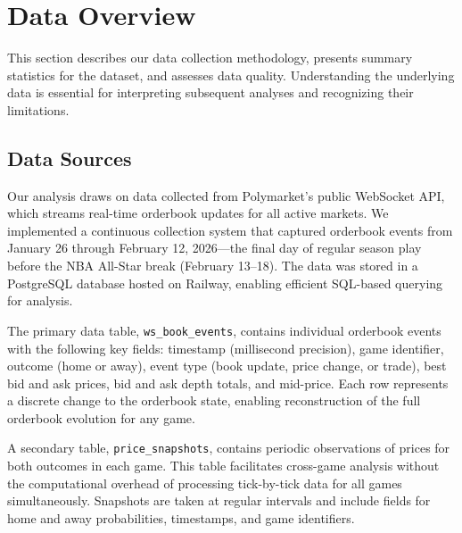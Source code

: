 
\chapter{Data Overview}
\label{sec:data}

This section describes our data collection methodology, presents summary statistics for the dataset, and assesses data quality. Understanding the underlying data is essential for interpreting subsequent analyses and recognizing their limitations.

\section{Data Sources}

Our analysis draws on data collected from Polymarket's public WebSocket API, which streams real-time orderbook updates for all active markets. We implemented a continuous collection system that captured orderbook events from January 26 through February 12, 2026---the final day of regular season play before the NBA All-Star break (February 13--18). The data was stored in a PostgreSQL database hosted on Railway, enabling efficient SQL-based querying for analysis.

The primary data table, \texttt{ws\_book\_events}, contains individual orderbook events with the following key fields: timestamp (millisecond precision), game identifier, outcome (home or away), event type (book update, price change, or trade), best bid and ask prices, bid and ask depth totals, and mid-price. Each row represents a discrete change to the orderbook state, enabling reconstruction of the full orderbook evolution for any game.

A secondary table, \texttt{price\_snapshots}, contains periodic observations of prices for both outcomes in each game. This table facilitates cross-game analysis without the computational overhead of processing tick-by-tick data for all games simultaneously. Snapshots are taken at regular intervals and include fields for home and away probabilities, timestamps, and game identifiers.

